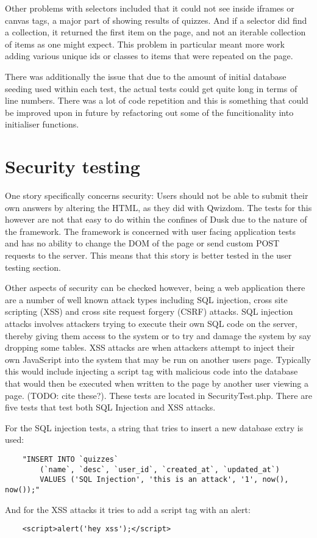 Other problems with selectors included that it could not see inside iframes or canvas tags, a major part of showing results of quizzes. And if a selector did find a collection, it returned the first item on the page, and not an iterable collection of items as one might expect. This problem in particular meant more work adding various unique ids or classes to items that were repeated on the page.

There was additionally the issue that due to the amount of initial database seeding used within each test, the actual tests could get quite long in terms of line numbers. There was a lot of code repetition and this is something that could be improved upon in future by refactoring out some of the funcitionality into initialiser functions.

\section{Security testing}
One story specifically concerns security: Users should not be able to submit their own answers by altering the HTML, as they did with Qwizdom. The tests for this however are not that easy to do within the confines of Dusk due to the nature of the framework. The framework is concerned with user facing application tests and has no ability to change the DOM of the page or send custom POST requests to the server. This means that this story is better tested in the user testing section.

Other aspects of security can be checked however, being a web application there are a number of well known attack types including SQL injection, cross site scripting (XSS) and cross site request forgery (CSRF) attacks. SQL injection attacks involves attackers trying to execute their own SQL code on the server, thereby giving them access to the system or to try and damage the system by say dropping some tables. XSS attacks are when attackers attempt to inject their own JavaScript into the system that may be run on another users page. Typically this would include injecting a script tag with malicious code into the database that would then be executed when written to the page by another user viewing a page. (TODO: cite these?). These tests are located in SecurityTest.php. There are five tests that test both SQL Injection and XSS attacks.  

For the SQL injection tests, a string that tries to insert a new database extry is used:
\begin{verbatim}
	"INSERT INTO `quizzes` 
		(`name`, `desc`, `user_id`, `created_at`, `updated_at`) 
		VALUES ('SQL Injection', 'this is an attack', '1', now(), now());"
\end{verbatim}
And for the XSS attacks it tries to add a script tag with an alert:
\begin{verbatim}
	<script>alert('hey xss');</script>
\end{verbatim} 

